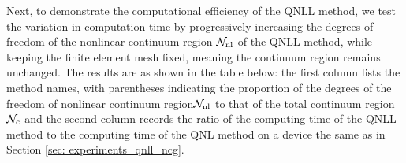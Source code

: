 Next, to demonstrate the computational efficiency of the QNLL method, we test the variation in computation time by progressively increasing the degrees of freedom of the nonlinear continuum region $ \mathcal{N}_{{\rm nl}}$ of the QNLL method, while keeping the finite element mesh fixed, meaning the continuum region remains unchanged. The results are as shown in the table below: the first column lists the method names, with parentheses indicating the proportion of the degrees of the freedom of nonlinear continuum region$ \mathcal{N}_{{\rm nl}} $ to that of the total continuum region$ \mathcal{N}_{{\rm c}}$ and the second column records the ratio of the computing time of the QNLL method to the computing time of the QNL method on a device the same as in Section \ref{sec: experiments_qnll_ncg}.


